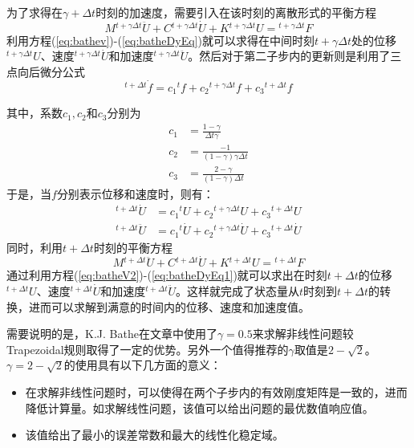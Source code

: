为了求得在$\gamma+\Delta t$时刻的加速度，需要引入在该时刻的离散形式的平衡方程
\begin{equation}
	M{^{t+\gamma\Delta t}\!\ddot{U}}+C{^{t+\gamma\Delta t}\!\dot{U}}+K{^{t+\gamma\Delta t}\!U}={^{t+\gamma\Delta t}\!F}\label{eq:batheDyEq}
\end{equation}
利用方程(\ref{eq:bathev})-(\ref{eq:batheDyEq})就可以求得在中间时刻$t+\gamma\Delta t$处的位移${^{t+\gamma\Delta t}\!U}$、速度${^{t+\gamma\Delta t}\!\dot{U}}$和加速度${^{t+\gamma\Delta t}\!\ddot{U}}$。然后对于第二子步内的更新则是利用了三点向后微分公式\cite{Bathe2005}
\begin{equation}	
	{^{t+\Delta t}\!\dot{f}}=c_1{^t\!f}+c_2{^{t+\gamma\Delta t}\!f}+c_3{^{t+\Delta t}\!f}
\end{equation}

其中，系数$c_1,c_2$和$c_3$分别为
\begin{align}
	c_1&=\frac{1-\gamma}{\Delta t\gamma}\\
	c_2&=\frac{-1}{(1-\gamma)\gamma\Delta t}\\
	c_3&=\frac{2-\gamma}{(1-\gamma)\Delta t}
\end{align}
于是，当$f$分别表示位移和速度时，则有：
\begin{align}
	{^{t+\Delta t}\!\dot{U}}&=c_1{^t\!U}+c_2{^{t+\gamma\Delta t}\!U}+c_3{^{t+\Delta t}\!U}\label{eq:batheV2}\\
	{^{t+\Delta t}\!\ddot{U}}&=c_1{^t\!\dot{U}}+c_2{^{t+\gamma\Delta t}\!\dot{U}}+c_3{^{t+\Delta t}\!\dot{U}}\label{eq:batheA2}
\end{align}
同时，利用$t+\Delta t$时刻的平衡方程
\begin{equation}
	M{^{t+\Delta t}\!\ddot{U}}+C{^{t+\Delta t}\!\dot{U}}+K{^{t+\Delta t}\!U}={^{t+\Delta t}\!F}\label{eq:batheDyEq1}
\end{equation}
通过利用方程(\ref{eq:batheV2})-(\ref{eq:batheDyEq1})就可以求出在时刻$t+\Delta t$的位移${^{t+\Delta t}\!U}$、速度${^{t+\Delta t}\!\dot{U}}$和加速度${^{t+\Delta t}\!\ddot{U}}$。这样就完成了状态量从$t$时刻到$t+\Delta t$的转换，进而可以求解到满意的时间内的位移、速度和加速度值。

需要说明的是，K.J. Bathe在文章中使用了$\gamma=0.5$来求解非线性问题较Trapezoidal规则取得了一定的优势。另外一个值得推荐的$\gamma$取值是$2-\sqrt{2}$。$\gamma=2-\sqrt{2}$的使用具有以下几方面的意义：
\begin{itemize}
	\item 在求解非线性问题时，可以使得在两个子步内的有效刚度矩阵是一致的，进而降低计算量\cite{Dharmaraja2009,Bathe2007,Bathe2012a}。如求解线性问题，该值可以给出问题的最优数值响应值\cite{Bathe2007,Bathe2012a}。
	\item 该值给出了最小的误差常数和最大的线性化稳定域\cite{Dharmaraja2009}。
\end{itemize}

